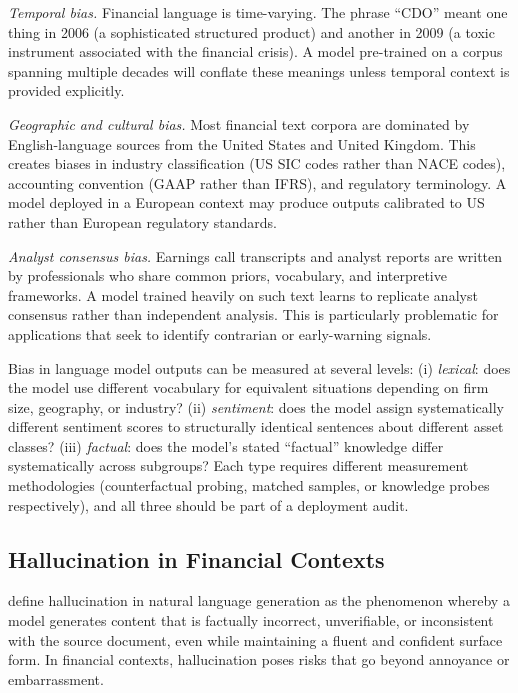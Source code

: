 \begin{context}
\emph{Temporal bias.}  Financial language is time-varying.  The phrase ``CDO''
meant one thing in 2006 (a sophisticated structured product) and another in
2009 (a toxic instrument associated with the financial crisis).  A model
pre-trained on a corpus spanning multiple decades will conflate these meanings
unless temporal context is provided explicitly.

\emph{Geographic and cultural bias.}  Most financial text corpora are dominated
by English-language sources from the United States and United Kingdom.  This
creates biases in industry classification (US SIC codes rather than NACE
codes), accounting convention (GAAP rather than IFRS), and regulatory
terminology.  A model deployed in a European context may produce outputs
calibrated to US rather than European regulatory standards.

\emph{Analyst consensus bias.}  Earnings call transcripts and analyst reports
are written by professionals who share common priors, vocabulary, and
interpretive frameworks.  A model trained heavily on such text learns to
replicate analyst consensus rather than independent analysis.  This is
particularly problematic for applications that seek to identify contrarian
or early-warning signals.

\begin{remark}
\label{rem:bias-measurement}
Bias in language model outputs can be measured at several levels:
(i) \emph{lexical}: does the model use different vocabulary for equivalent
situations depending on firm size, geography, or industry?
(ii) \emph{sentiment}: does the model assign systematically different sentiment
scores to structurally identical sentences about different asset classes?
(iii) \emph{factual}: does the model's stated ``factual'' knowledge differ
systematically across subgroups?  Each type requires different measurement
methodologies (counterfactual probing, matched samples, or knowledge probes
respectively), and all three should be part of a deployment audit.
\end{remark}

\subsection{Hallucination in Financial Contexts}
\label{subsec:hallucination}

\citet{ji2023survey} define hallucination in natural language generation as
the phenomenon whereby a model generates content that is factually incorrect,
unverifiable, or inconsistent with the source document, even while maintaining
a fluent and confident surface form.  In financial contexts, hallucination
poses risks that go beyond annoyance or embarrassment.


\end{context}
